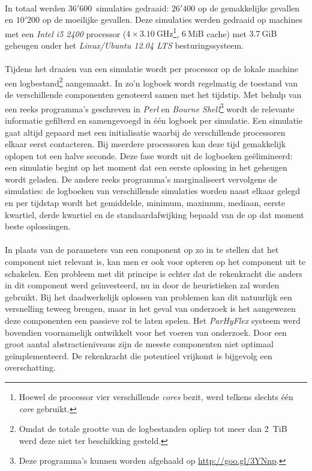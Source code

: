 \paragraph{}
In totaal werden $36'600$~simulaties gedraaid: $26'400$ op de gemakkelijke gevallen en $10'200$ op de moeilijke gevallen. Deze simulaties werden gedraaid op machines met een \emph{Intel i5 2400} processor ($4\times3.10~\mbox{GHz}$\footnote{Hoewel de processor vier verschillende \emph{cores} bezit, werd telkens slechts \'e\'en \emph{core} gebruikt.}, $6~\mbox{MiB}$ cache) met $3.7~\mbox{GiB}$ geheugen onder het \emph{Linux/Ubuntu 12.04 LTS} besturingssysteem.

\paragraph{}
Tijdens het draaien van een simulatie wordt per processor op de lokale machine een logbestand\footnote{Omdat de totale grootte van de logbestanden opliep tot meer dan 2~\mbox{TiB} werd deze niet ter beschikking gesteld.} aangemaakt. In zo'n logboek wordt regelmatig de toestand van de verschillende componenten genoteerd samen met het tijdstip. Met behulp van een reeks programma's geschreven in \emph{Perl} en \emph{Bourne Shell}\footnote{Deze programma's kunnen worden afgehaald op \url{http://goo.gl/3YNnp}.} wordt de relevante informatie gefilterd en samengevoegd in \'e\'en logboek per simulatie. Een simulatie gaat altijd gepaard met een initialisatie waarbij de verschillende processoren elkaar eerst contacteren. Bij meerdere processoren kan deze tijd gemakkelijk oplopen tot een halve seconde. Deze fase wordt uit de logboeken ge\"elimineerd: een simulatie begint op het moment dat een eerste oplossing in het geheugen wordt geladen. De andere reeks programma's marginaliseert vervolgens de simulaties: de logboeken van verschillende simulaties worden naast elkaar gelegd en per tijdstap wordt het gemiddelde, minimum, maximum, mediaan, eerste kwartiel, derde kwartiel en de standaardafwijking bepaald van de op dat moment beste oplossingen.

\paragraph{}
In plaats van de parameters van een component op zo in te stellen dat het component niet relevant is, kan men er ook voor opteren op het component uit te schakelen. Een probleem met dit principe is echter dat de rekenkracht die anders in dit component werd ge\"investeerd, nu in door de heuristieken zal worden gebruikt. Bij het daadwerkelijk oplossen van problemen kan dit natuurlijk een versnelling teweeg brengen, maar in het geval van onderzoek is het aangewezen deze componenten een passieve rol te laten spelen. Het \emph{ParHyFlex} systeem werd bovendien voornamelijk ontwikkelt voor het voeren van onderzoek. Door een groot aantal abstractieniveaus zijn de meeste componenten niet optimaal ge\"implementeerd. De rekenkracht die potentieel vrijkomt is bijgevolg een overschatting.


